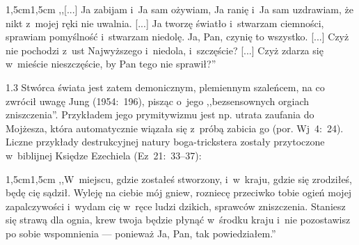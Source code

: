 \documentclass[11pt,a4paper,twoside]{report}
\begin{document}
\begin{adjustwidth}{1,5cm}{1,5cm}
\small{
,,[...] Ja zabijam i~Ja sam ożywiam, Ja ranię i~Ja sam uzdrawiam, że nikt z~mojej ręki nie uwalnia. [...]
Ja tworzę światło i~stwarzam ciemności, sprawiam pomyślność i~stwarzam niedolę. Ja, Pan, czynię to wszystko. [...]
Czyż nie pochodzi z~ust Najwyższego i~niedola, i~szczęście? [...]
Czyż zdarza się w~mieście nieszczęście, by Pan tego nie sprawił?''\\
}
\end{adjustwidth}

\begin{spacing}{1.3}
Stwórca świata jest zatem demonicznym, plemiennym szaleńcem, na co zwrócił uwagę Jung (1954:~196), pisząc o~jego ,,bezsensownych orgiach zniszczenia''. Przykładem jego prymitywizmu jest np. utrata zaufania do Mojżesza, która automatycznie wiązała się z~próbą zabicia go (por. Wj~4:~24). Liczne przykłady destrukcyjnej natury boga-trickstera zostały przytoczone w~biblijnej Księdze Ezechiela (Ez~21:~33--37):
\end{spacing}

\begin{adjustwidth}{1,5cm}{1,5cm}
\small{
,,W~miejscu, gdzie zostałeś stworzony, i~w~kraju, gdzie się zrodziłeś, będę cię sądził. Wyleję na ciebie mój gniew, rozniecę przeciwko tobie ogień mojej zapalczywości i~wydam cię w~ręce ludzi dzikich, sprawców zniszczenia. Staniesz się strawą dla ognia, krew twoja będzie płynąć w~środku kraju i~nie pozostawisz po sobie wspomnienia --- ponieważ Ja, Pan, tak powiedziałem.''\\
}
\end{adjustwidth}
\end{document}
